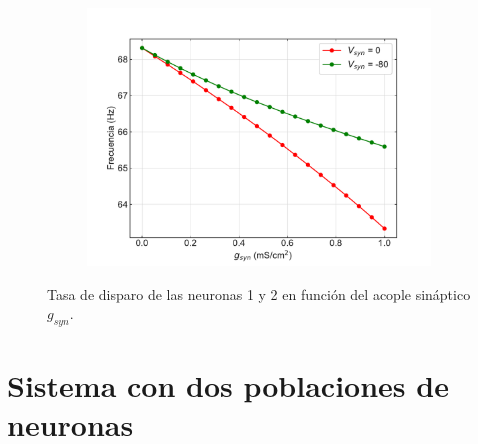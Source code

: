 \documentclass[11pt,twocolumn,twoside]{opticajnl}
\begin{document}
\begin{figure}[ht]
    \centering
         \begin{subfigure}[b]{\linewidth}
            \includegraphics[width=\textwidth]{Figuras/frecuencia_vs_gsyn.pdf}
         \end{subfigure}
    \caption{Tasa de disparo de las neuronas 1 y 2 en función del acople sináptico $g_{syn}$.} 
    \label{fig:frecuencia}
\end{figure}

\newpage

\section{Sistema con dos poblaciones de neuronas \label{sec:p2}}

\vspace{0.3cm}
\end{document}
